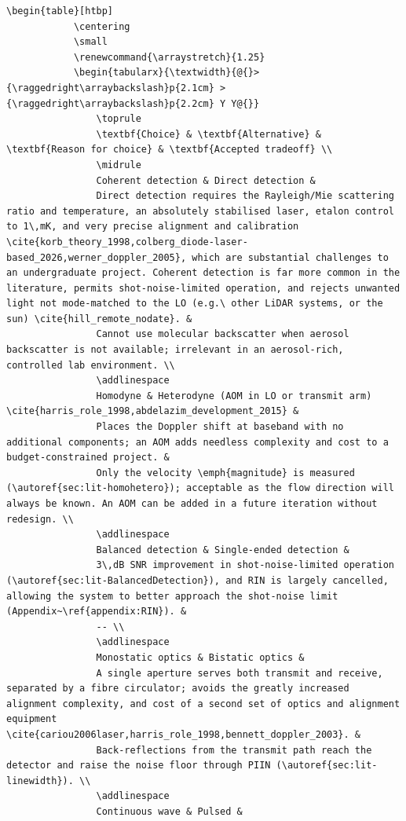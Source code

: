 \begin{tcolorbox}[breakable, colback=gray!4, colframe=gray!50,
	boxrule=0.4pt, arc=2pt, fontupper=\small,
	left=6pt, right=6pt, top=4pt, bottom=4pt]
\begin{lstlisting}[style=airesponse]
		\begin{table}[htbp]
			\centering
			\small
			\renewcommand{\arraystretch}{1.25}
			\begin{tabularx}{\textwidth}{@{}>{\raggedright\arraybackslash}p{2.1cm} >{\raggedright\arraybackslash}p{2.2cm} Y Y@{}}
				\toprule
				\textbf{Choice} & \textbf{Alternative} & \textbf{Reason for choice} & \textbf{Accepted tradeoff} \\
				\midrule
				Coherent detection & Direct detection &
				Direct detection requires the Rayleigh/Mie scattering ratio and temperature, an absolutely stabilised laser, etalon control to 1\,mK, and very precise alignment and calibration \cite{korb_theory_1998,colberg_diode-laser-based_2026,werner_doppler_2005}, which are substantial challenges to an undergraduate project. Coherent detection is far more common in the literature, permits shot-noise-limited operation, and rejects unwanted light not mode-matched to the LO (e.g.\ other LiDAR systems, or the sun) \cite{hill_remote_nodate}. &
				Cannot use molecular backscatter when aerosol backscatter is not available; irrelevant in an aerosol-rich, controlled lab environment. \\
				\addlinespace
				Homodyne & Heterodyne (AOM in LO or transmit arm) \cite{harris_role_1998,abdelazim_development_2015} &
				Places the Doppler shift at baseband with no additional components; an AOM adds needless complexity and cost to a budget-constrained project. &
				Only the velocity \emph{magnitude} is measured (\autoref{sec:lit-homohetero}); acceptable as the flow direction will always be known. An AOM can be added in a future iteration without redesign. \\
				\addlinespace
				Balanced detection & Single-ended detection &
				3\,dB SNR improvement in shot-noise-limited operation (\autoref{sec:lit-BalancedDetection}), and RIN is largely cancelled, allowing the system to better approach the shot-noise limit (Appendix~\ref{appendix:RIN}). &
				-- \\
				\addlinespace
				Monostatic optics & Bistatic optics &
				A single aperture serves both transmit and receive, separated by a fibre circulator; avoids the greatly increased alignment complexity, and cost of a second set of optics and alignment equipment \cite{cariou2006laser,harris_role_1998,bennett_doppler_2003}. &
				Back-reflections from the transmit path reach the detector and raise the noise floor through PIIN (\autoref{sec:lit-linewidth}). \\
				\addlinespace
				Continuous wave & Pulsed &

\end{lstlisting}
\end{tcolorbox}

